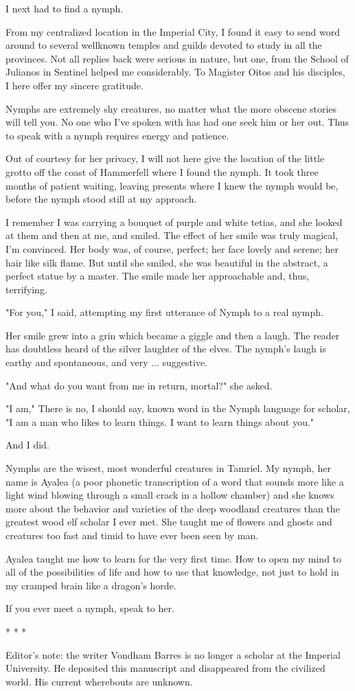 I next had to find a nymph.

From my centralized location in the Imperial City, I found it easy to send word around to several wellknown temples and guilds devoted to study in all the provinces. Not all replies back were serious in nature, but one, from the School of Julianos in Sentinel helped me considerably. To Magister Oitos and his disciples, I here offer my sincere gratitude.

Nymphs are extremely shy creatures, no matter what the more obscene stories will tell you. No one who I've spoken with has had one seek him or her out. Thus to speak with a nymph requires energy and patience.

Out of courtesy for her privacy, I will not here give the location of the little grotto off the coast of Hammerfell where I found the nymph. It took three months of patient waiting, leaving presents where I knew the nymph would be, before the nymph stood still at my approach.

I remember I was carrying a bouquet of purple and white tetias, and she looked at them and then at me, and smiled. The effect of her smile was truly magical, I'm convinced. Her body was, of course, perfect; her face lovely and serene; her hair like silk flame. But until she smiled, she was beautiful in the abstract, a perfect statue by a master. The smile made her approachable and, thus, terrifying.

"For you," I said, attempting my first utterance of Nymph to a real nymph.

Her smile grew into a grin which became a giggle and then a laugh. The reader has doubtless heard of the silver laughter of the elves. The nymph's laugh is earthy and spontaneous, and very ... suggestive.

"And what do you want from me in return, mortal?" she asked.

"I am," There is no, I should say, known word in the Nymph language for scholar, "I am a man who likes to learn things. I want to learn things about you."

And I did.

Nymphs are the wisest, most wonderful creatures in Tamriel. My nymph, her name is Ayalea (a poor phonetic transcription of a word that sounds more like a light wind blowing through a small crack in a hollow chamber) and she knows more about the behavior and varieties of the deep woodland creatures than the greatest wood elf scholar I ever met. She taught me of flowers and ghosts and creatures too fast and timid to have ever been seen by man.

Ayalea taught me how to learn for the very first time. How to open my mind to all of the possibilities of life and how to use that knowledge, not just to hold in my cramped brain like a dragon's horde.

If you ever meet a nymph, speak to her.

* * *

Editor's note: the writer Vondham Barres is no longer a scholar at the Imperial University. He deposited this manuscript and disappeared from the civilized world. His current wherebouts are unknown.